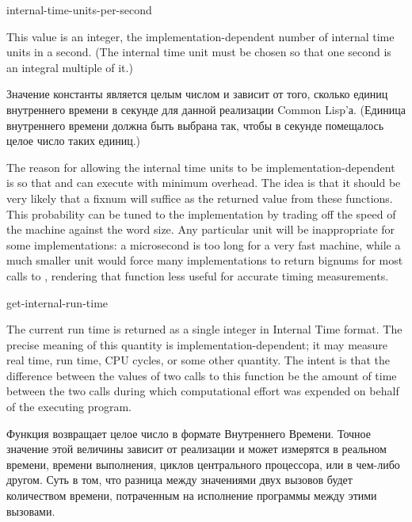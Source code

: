 \begin{defun}[Constant]
internal-time-units-per-second

This value is an integer, the implementation-dependent
number of internal time units in a second.  (The internal time unit must
be chosen so that one second is an integral multiple of it.)

Значение константы является целым числом и зависит от того, сколько единиц
внутреннего времени в секунде для данной реализации Common Lisp'а.
(Единица внутреннего времени должна быть выбрана так, чтобы в секунде помещалось
целое число таких единиц.)

\beforenoterule
\begin{rationale}
The reason for allowing the internal time
units to be implementation-dependent is so that
 and 
can execute with minimum overhead.
The idea is that it should be very likely that a fixnum will suffice as the
returned value from these functions.  This probability can be
tuned to the implementation by trading off the speed of the machine
against the word size.  Any particular unit will
be inappropriate for some implementations: a microsecond is too long
for a very fast machine, while a much smaller unit would
force many implementations to return bignums for most calls
to , rendering that function less useful for accurate
timing measurements.
\end{rationale}
\afternoterule
\end{defun}

\begin{defun}[Function]
get-internal-run-time 

The current run time is returned as a single integer in Internal Time
format.
The precise meaning of this quantity is implementation-dependent;
it may measure real time, run time, CPU cycles, or some other quantity.
The intent is that the difference between the values of two calls
to this function be the amount of time between the two calls
during which computational effort was expended on behalf of the
executing program.

Функция возвращает целое число в формате Внутреннего Времени. 
Точное значение этой величины зависит от реализации и может измерятся в реальном
времени, времени выполнения, циклов центрального процессора, или в чем-либо
другом.
Суть в том, что разница между значениями двух вызовов будет количеством времени,
потраченным на исполнение программы между этими вызовами.
\end{defun}

